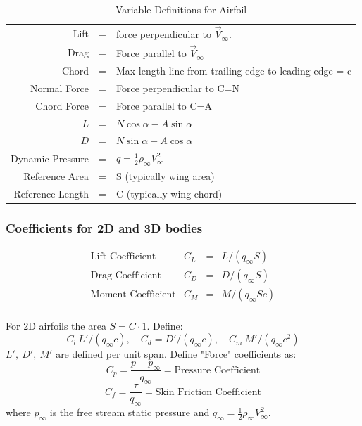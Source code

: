 \documentclass[draft=false, titlepage]{article}
\begin{document}
\begin{table}[ht]
\centering
\renewcommand{\arraystretch}{1.3}
\caption{Variable Definitions for Airfoil}
\begin{tabular}{rcl}
\hline
Lift &=& force perpendicular to $\vec{V}_\infty$.\\
Drag &=& Force parallel to $\vec{V}_\infty$\\
Chord &=& Max length line from trailing edge to leading edge = c\\
Normal Force &=& Force perpendicular to C=N\\
Chord Force &=& Force parallel to C=A\\
$L$ &=& $N\cos\alpha - A\sin\alpha$\\
$D$ &=& $N\sin\alpha + A\cos\alpha$\\
Dynamic Pressure &=& $q=\frac{1}{2}\rho_\infty V_\infty ^2$\\
Reference Area &=& S (typically wing area)\\
Reference Length &=& C (typically wing chord)\\
\hline
\end{tabular}

\end{table}

\subsubsection{Coefficients for 2D and 3D bodies}

\begin{equation}
    \begin{array}{lrcl}
         \text{Lift Coefficient} & C_L &=& L/(q_\infty S)\\
         \text{Drag Coefficient} & C_D &=& D/(q_\infty S)\\
         \text{Moment Coefficient} & C_M &=& M/(q_\infty Sc)\\
    \end{array}
\end{equation}

For 2D airfoils the area $S=C\cdot 1$. Define:
\begin{equation}
    C_l \ L'/(q_\infty c),\quad C_d = D'/(q_\infty c),\quad C_m \ M'/(q_\infty c^2)
\end{equation}
$L',\ D',\ M'$ are defined per unit span. Define "Force" coefficients as:
\begin{equation}
    C_p = \frac{p-p_\infty}{q_\infty} = \text{Pressure Coefficient}
\end{equation}
\begin{equation}
    C_f = \frac{\tau}{q_\infty} = \text{Skin Friction Coefficient}
\end{equation}
where $p_\infty$ is the free stream static pressure and $q_\infty = \frac{1}{2}\rho_\infty V_\infty ^2$.
\end{document}
